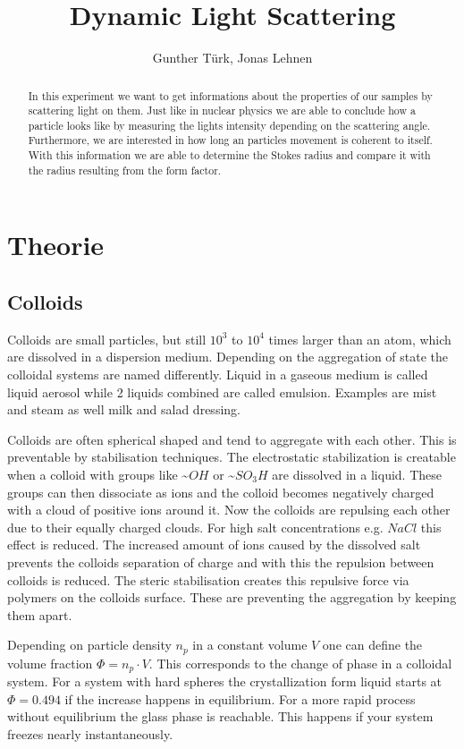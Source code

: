 \documentclass[]{article}
\title{Dynamic Light Scattering}
\author{Gunther T\"urk, Jonas Lehnen}
\begin{document}
\maketitle
\begin{abstract}
In this experiment we want to get informations about the properties of our samples by scattering light on them. Just like in nuclear physics we are able to conclude how a particle looks like by measuring the lights intensity depending on the scattering angle. Furthermore, we are interested in how long an particles movement is coherent to itself. With this information we are able to determine the Stokes radius and compare it with the radius resulting from the form factor.

\end{abstract}

\tableofcontents


\section{Theorie}
\subsection{Colloids}
Colloids are small particles, but still $10^3$ to $10^4$ times larger than an atom, which are dissolved in a dispersion medium. Depending on the aggregation of state the colloidal systems are named differently. Liquid in a gaseous medium is called liquid aerosol while 2 liquids combined are called emulsion. Examples are mist and steam as well milk and salad dressing.


Colloids are often spherical shaped and tend to aggregate with each other. This is preventable by stabilisation techniques. The electrostatic stabilization is creatable when a colloid with groups like \textasciitilde$OH$ or \textasciitilde$SO_3H$ are dissolved in a liquid. These groups  can then dissociate as ions and the colloid becomes negatively charged with a cloud of positive ions around it. Now the colloids are repulsing each other due to their equally charged clouds. For high salt concentrations e.g. $NaCl$ this effect is reduced. The increased amount of ions caused by the dissolved salt prevents the colloids separation of charge and with this the repulsion between colloids is reduced. 
The steric stabilisation creates this repulsive force via polymers on the colloids surface. These are preventing the aggregation by keeping them apart.

Depending on particle density $n_p$ in a constant volume $V$ one can define the volume fraction $\Phi = n_p \cdot V$. This corresponds to the change of phase in a colloidal system. For a system with hard spheres the crystallization form liquid starts at $\Phi=0.494$ if the increase happens in equilibrium. For a more rapid process without equilibrium the glass phase is reachable. This happens if your system freezes nearly instantaneously.  
\end{document}
